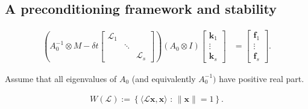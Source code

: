 \documentclass[review]{siamart}
\begin{document}


\subsection{A preconditioning framework and stability}\label{sec:intro:stab}

%
\begin{align}\label{eq:keq}
\left( A_0^{-1}\otimes M - \delta t \begin{bmatrix} \mathcal{L}_1  & \\ & \ddots \\ && \mathcal{L}_s\end{bmatrix}\right)
	(A_0\otimes I)	\begin{bmatrix} \mathbf{k}_1 \\ \vdots \\ \mathbf{k}_s \end{bmatrix}
& = \begin{bmatrix} \mathbf{f}_1 \\ \vdots \\ \mathbf{f}_s \end{bmatrix}.
\end{align}

%
\begin{assumption}\label{ass:eig}
Assume that all eigenvalues of $A_0$ (and equivalently $A_0^{-1})$ have positive real part.
\end{assumption}


\begin{align}\label{eq:fov}
W(\mathcal{L}) := \left\{ \langle \mathcal{L}\mathbf{x},\mathbf{x}\rangle \text{ : }
	\|\mathbf{x}\| = 1 \right\}.
\end{align}
\end{document}
